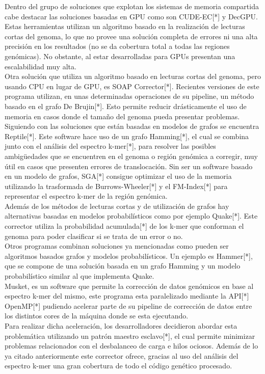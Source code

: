 \documentclass[conference]{IEEEtran}
\begin{document}
Dentro del grupo de soluciones que explotan los sistemas de memoria compartida cabe destacar las soluciones basadas en GPU como son CUDE-EC[*] y DecGPU\cite{decgpu}. Estas herramientas utilizan un algoritmo basado en la realización de lecturas cortas del genoma, lo que no provee una solución completa de errores ni una alta precisión en los resultados (no se da cobertura total a todas las regiones genómicas). No obstante, al estar desarrolladas para GPUs presentan una escalabilidad muy alta.\\

Otra solución que utiliza un algoritmo basado en lecturas cortas del genoma, pero usando CPU en lugar de GPU, es SOAP Corrector[*]. Recientes versiones de este programa utilizan, en unas determinadas operaciones de su pipeline, un método basado en el grafo De Brujin[*]. Esto permite reducir drásticamente el uso de memoria en casos donde el tamaño del genoma pueda presentar problemas.\\

Siguiendo con las soluciones que están basadas en modelos de grafos se encuentra Reptile[*]. Este software hace uso de un grafo Hamming[*], el cual se combina junto con el análisis del espectro k-mer[*], para resolver las posibles ambigüedades que se encuentren en el genoma o región genómica a corregir, muy útil en casos que presenten errores de translocación. Sin ser un software basado en un modelo de grafos, SGA[*] consigue optimizar el uso de la memoria utilizando la trasformada de Burrows-Wheeler[*] y el FM-Index[*] para representar el espectro k-mer de la región genómica.\\

Además de los métodos de lecturas cortas y de utilización de grafos hay alternativas basadas en modelos probabilísticos como por ejemplo Quake[*]. Este corrector utiliza la probabilidad acumulada[*] de los k-mer que conforman el genoma para poder clasificar si se trata de un error o no.\\

Otros programas combinan soluciones ya mencionadas como pueden ser algoritmos basados grafos y modelos probabilísticos. Un ejemplo es Hammer[*], que se compone de una solución basada en un grafo Hamming y un modelo probabilístico similar al que implementa Quake.\\

Musket\cite{musket}, es un software que permite la corrección de datos genómicos en base al espectro k-mer del mismo, este programa esta paralelizado mediante la API[*] OpenMP[*] pudiendo acelerar parte de su pipeline de corrección de datos entre los distintos cores de la máquina donde se esta ejecutando.\\
Para realizar dicha aceleración, los desarrolladores decidieron abordar esta problemática utilizando un patrón maestro esclavo[*], el cual permite minimizar problemas relacionados con el desbalanceo de carga e hilos ociosos. Además de lo ya citado anteriormente este corrector ofrece, gracias al uso del análisis del espectro k-mer una gran cobertura de todo el código genético procesado.\\
\end{document}
